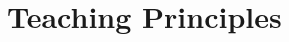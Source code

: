 \documentclass[12pt,twoside]{mitthesis}
\providecommand{\DIFaddbegin}{} %
\providecommand{\DIFaddend}{} %
\providecommand{\DIFdelbegin}{} %
\begin{document}
\DIFaddbegin \section{Teaching Principles}
\DIFaddend 


\DIFdelbegin %




\end{document}
